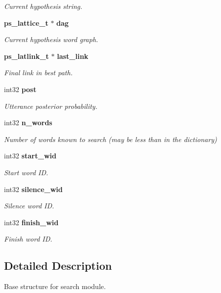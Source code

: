 \begin{DoxyCompactItemize}
\begin{DoxyCompactList}\small\item\em Current hypothesis string. \end{DoxyCompactList}\item 
{\bf ps\-\_\-lattice\-\_\-t} $\ast$ {\bf dag}
\begin{DoxyCompactList}\small\item\em Current hypothesis word graph. \end{DoxyCompactList}\item 
{\bf ps\-\_\-latlink\-\_\-t} $\ast$ {\bf last\-\_\-link}
\begin{DoxyCompactList}\small\item\em Final link in best path. \end{DoxyCompactList}\item 
int32 {\bf post}
\begin{DoxyCompactList}\small\item\em Utterance posterior probability. \end{DoxyCompactList}\item 
int32 {\bf n\-\_\-words}\label{structps__search__s_ad4d98deb905bd664ec44313ea0065b1a}

\begin{DoxyCompactList}\small\item\em Number of words known to search (may be less than in the dictionary) \end{DoxyCompactList}\item 
int32 {\bf start\-\_\-wid}
\begin{DoxyCompactList}\small\item\em Start word I\-D. \end{DoxyCompactList}\item 
int32 {\bf silence\-\_\-wid}
\begin{DoxyCompactList}\small\item\em Silence word I\-D. \end{DoxyCompactList}\item 
int32 {\bf finish\-\_\-wid}
\begin{DoxyCompactList}\small\item\em Finish word I\-D. \end{DoxyCompactList}\end{DoxyCompactItemize}


\subsection{Detailed Description}
Base structure for search module. 

